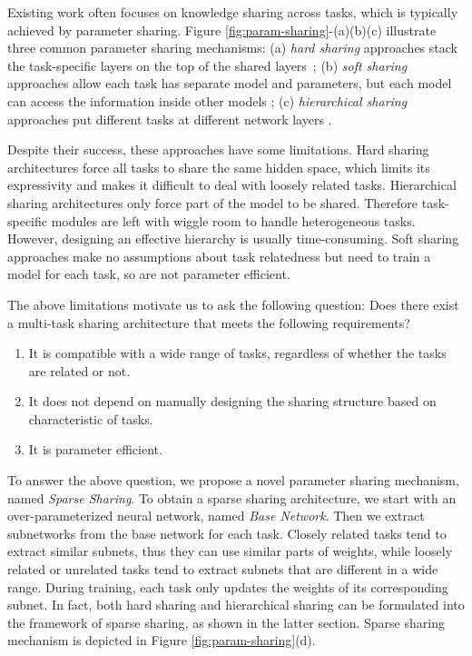 \documentclass[letterpaper]{article} %
\begin{document}
Existing work often focuses on knowledge sharing across tasks, which is typically achieved by parameter sharing. Figure \ref{fig:param-sharing}-(a)(b)(c) illustrate three common parameter sharing mechanisms: (a) \emph{hard sharing} approaches stack the task-specific layers on the top of the shared layers~\cite{DBLP:conf/icml/CollobertW08,DBLP:conf/iclr/SubramanianTBP18,DBLP:conf/acl/LiuHCG19}; (b) \emph{soft sharing} approaches allow each task has separate model and parameters, but each model can access the information inside other models \cite{DBLP:conf/cvpr/MisraSGH16,DBLP:conf/ijcai/LiuQH16,DBLP:conf/aaai/RuderBAS19}; (c) \emph{hierarchical sharing} approaches put different tasks at different network layers \cite{DBLP:conf/acl/SogaardG16,DBLP:conf/emnlp/HashimotoXTS17}.

Despite their success, these approaches have some limitations. Hard sharing architectures force all tasks to share the same hidden space, which limits its expressivity and makes it difficult to deal with loosely related tasks. Hierarchical sharing architectures only force part of the model to be shared. Therefore task-specific modules are left with wiggle room to handle heterogeneous tasks. However, designing an effective hierarchy is usually time-consuming. Soft sharing approaches make no assumptions about task relatedness but need to train a model for each task, so are not parameter efficient.

The above limitations motivate us to ask the following question: Does there exist a multi-task sharing architecture that meets the following requirements?
\begin{enumerate}
    \item It is compatible with a wide range of tasks, regardless of whether the tasks are related or not.
    \item It does not depend on manually designing the sharing structure based on characteristic of tasks.
    \item It is parameter efficient.
\end{enumerate}

To answer the above question, we propose a novel parameter sharing mechanism, named \emph{Sparse Sharing}. To obtain a sparse sharing architecture, we start with an over-parameterized neural network, named \emph{Base Network}. Then we extract subnetworks from the base network for each task. Closely related tasks tend to extract similar subnets, thus they can use similar parts of weights, while loosely related or unrelated tasks tend to extract subnets that are different in a wide range. During training, each task only updates the weights of its corresponding subnet. In fact, both hard sharing and hierarchical sharing can be formulated into the framework of sparse sharing, as shown in the latter section. Sparse sharing mechanism is depicted in Figure \ref{fig:param-sharing}(d).
\end{document}

